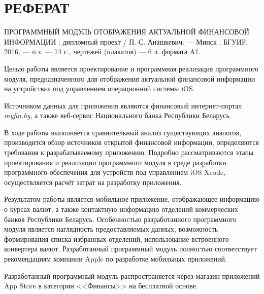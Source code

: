 \section*{РЕФЕРАТ}
\thispagestyle{empty}

ПРОГРАММНЫЙ МОДУЛЬ ОТОБРАЖЕНИЯ АКТУАЛЬНОЙ ФИНАНСОВОЙ ИНФОРМАЦИИ :
дипломный проект / П. С. Анашкевич. --- Минск : БГУИР, 2016, --- п.з. ---
74 с., чертежей (плакатов) --- 6 л. формата A1.

Целью работы является проектирование и программная реализация программного модуля,
предназначенного для отображения актуальной финансовой информации на устройствах
под управлением операционной системы iOS.

Источником данных для приложения являются финансовый
интернет-портал \textit{myfin.by}, а также веб-сервис Национального банка
Республики Беларусь.

В ходе работы выполняется сравнительный анализ существующих аналогов,
производится обзор источников открытой финансовой информации, определяются
требования к разрабатываемому приложению. Подробно рассматриваются этапы проектирования
и реализации программного модуля в среде разработки программного обеспечения
для устройств под управлением iOS Xcode, осуществляется расчёт затрат
на разработку приложения.

Результатом работы является мобильное приложение, отображающее информацию о
курсах валют, а также контактную информацию отделений коммерческих банков
Республики Беларусь. Особенностью разработанного программного модуля является
наглядность предоставляемых данных, возможность формирования списка избранных
отделений, использование встроенного конвертера валют. Разработанный
программный модуль полностью соответствует рекомендациям компании Apple
по разработке мобильных приложений.

Разработанный программный модуль распространяется через магазин приложений App Store
в категории <<Финансы>> на бесплатной основе.

\pagebreak
